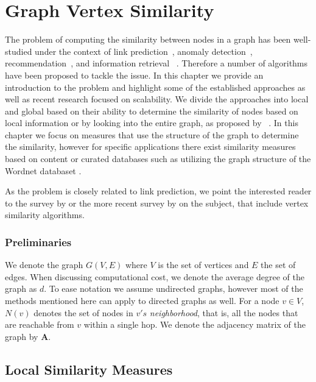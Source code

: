 \chapter{Graph Vertex Similarity}
\label{ch:bg-graph-similarity}

The problem of computing the similarity between nodes in a graph has been
well-studied under the context of link prediction~\cite{link-prediction-survey},
anomaly detection~\cite{graphsim-anomaly},
recommendation~\cite{graphsim-recommendation}, and information retrieval
~\cite{graphsim-retrieval}. Therefore a
number of algorithms have been proposed to tackle the issue.
In this chapter we provide an introduction to the problem and
highlight some of the established approaches as well as recent
research focused on scalability. We divide the approaches into local
and global based on their ability to determine the similarity of nodes
based on local information or by looking into the entire graph, as proposed by
~\citet{link-prediction-survey}.
In this chapter we focus on
measures that use the structure of the graph to determine the similarity,
however for specific applications there exist similarity measures
based on content or curated databases such as utilizing the graph
structure of the Wordnet databaset \cite{wordnet-similarity, wordnet-relatedness, wordsim}.

As the problem is closely related to link prediction, we point the interested reader to
the survey by \citet{link-prediction-survey} or the more
recent survey by \citet{link-prediction-survey-2017} on the subject,
that include vertex similarity algorithms.

\subsection*{Preliminaries}


We denote the graph $G(V, E)$ where $V$ is the set of vertices and $E$ the set
of edges. When discussing computational cost, we denote the average degree of the graph as $d$.
To ease notation we assume undirected graphs, however most of the methods
mentioned here can apply to directed graphs as well.
For a node $v \in V$, $N(v)$ denotes the set of nodes in $v's$ \emph{neighborhood},
that is, all the nodes that are reachable from $v$ within a single hop.
We denote the adjacency matrix of the graph by $\mathbf{A}$.


\section{Local Similarity Measures}

